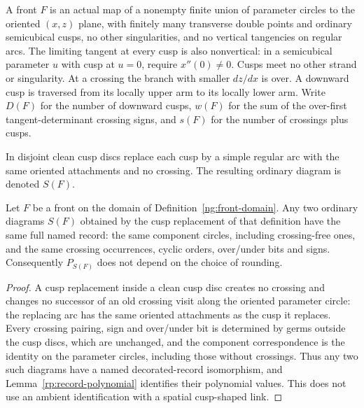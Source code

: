 \begin{definition}\label{ng:front-domain}
A front $F$ is an actual map of a nonempty finite union of parameter
circles to the oriented $(x,z)$ plane, with finitely many transverse
double points and ordinary semicubical cusps, no other singularities,
and no vertical tangencies on regular arcs. The limiting tangent at every
cusp is also nonvertical: in a semicubical parameter $u$ with cusp at
$u=0$, require $x''(0)\ne0$. Cusps meet no other strand or singularity.
At a crossing the branch with smaller $dz/dx$ is over. A downward cusp is
traversed from its locally upper arm to its locally lower arm. Write
$D(F)$ for the number of downward cusps, $w(F)$ for the sum of the
over-first tangent-determinant crossing signs, and $s(F)$ for the number
of crossings plus cusps.

In disjoint clean cusp discs replace each cusp by a simple regular arc
with the same oriented attachments and no crossing. The resulting
ordinary diagram is denoted $S(F)$.
\end{definition}

\begin{lemma}\label{ng:smoothing-record}
Let $F$ be a front on the domain of Definition~\ref{ng:front-domain}. Any two
ordinary diagrams $S(F)$ obtained by the cusp replacement of that definition
have the same full named record: the same component circles, including
crossing-free ones, and the same crossing occurrences, cyclic orders,
over/under bits and signs. Consequently $P_{S(F)}$ does not depend on the
choice of rounding.
\end{lemma}
\begin{proof}
A cusp replacement inside a clean cusp disc creates no crossing and changes
no successor of an old crossing visit along the oriented parameter circle:
the replacing arc has the same oriented attachments as the cusp it replaces.
Every crossing pairing, sign and over/under bit is determined by germs
outside the cusp discs, which are unchanged, and the component
correspondence is the identity on the parameter circles, including those
without crossings. Thus any two such diagrams have a named decorated-record
isomorphism, and Lemma~\ref{rp:record-polynomial} identifies their
polynomial values. This does not use an ambient identification with a
spatial cusp-shaped link.
\end{proof}

